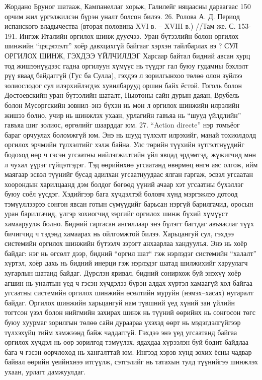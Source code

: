 Жордано Бруног шатааж, Кампанеллаг хорьж, Галилейг няцаасны дараагаас 150 орчим жил үргэлжилсэн бүрэн уналт болсон билээ. 26. Ролова А. Д. Период испанского владычества (вторая половина XVI в. – XVIII в.) //Там же. С. 153-191.
Ингэж Италийн оргилох шинж дуусчээ. Уран бүтээлийн болон оргилох шинжийн “цэцэглэлт” хоёр давхцахгүй байгааг хэрхэн тайлбарлах вэ ?
СУЛ ОРГИЛОХ ШИНЖ, ГЭХДЭЭ ҮЙЛЧИЛДЭГ
Харсаар байтал бидний авсан хурц тод жишээнүүдээс гадна оргилуун хүмүүс нь түүдэг гал буюу гудамны бэхлэлт рүү яваад байдаггүй (Гус ба Сулла), гэхдээ л зорилгынхоо төлөө олон зүйлээ золиослодог сул илэрхийлэгдэх хувилбарууд оршин байх ёстой. Гоголь болон Достоевскийн уран бүтээлийн шаталт, Ньютоны сайн дурын даяан, Врубель болон Мусоргскийн зовнил–энэ бүхэн нь мөн л оргилох шинжийн илрэлийн жишээ болно, учир нь шинжлэх ухаан, урлагийн гавъяа нь “шууд үйлдлийн” гавъяа шиг золиос, өргөлийг шаарддаг юм. 27. “Action directe” нэр томъёог бараг орчуулах боломжгүй юм. Энэ нь шууд түлхэлт илрэхийг, манай тохиолдолд оргилох эрчмийн түлхэлтийг хэлж байна.
Улс төрийн түүхийн зүтгэлтнүүдийг бодоход өөр ч гэсэн угсаатны нийлэгжилтийн үйл явцад эрдэмтэд, жүжигчид мөн л чухал үүрэг гүйцэтгэдэг. Тэд өөрийнхөө угсаатанд өвөрмөц өнгө аяс олгож, ийм маягаар эсвэл түүнийг бусад адилхан угсаатнуудаас ялган гаргаж, эсвэл угсаатан хоорондын харилцаанд дэм болдог бөгөөд үүний ачаар хэт угсаатны бүхэллэг буюу соёл үүсдэг. Хэдийгээр бага хүчдэлтэй боловч хүнд мэргэжлээ дотоод тэмүүллээрээ сонгон явсан готын сүмүүдийг барьсан нэргүй барилгачид, оросын уран барилгачид, үлгэр зохиогчид зэргийг оргилох шинж бүхий хүмүүст хамааруулж болно. Бидний гаргасан ангиллаар энэ бүлэгт багтдаг авъяаслаг түүх бичигчид ч тэдэнд хамаарах нь ойлгомжтой билээ.
Харьцангуй сул, гэхдээ системийн оргилох шинжийн бүтээлч зэрэгт анхаарлаа хандуулъя. Энэ нь хоёр байдаг: нэг нь өгсөлт дээр, бидний “оргил шат“ гэж нэрлэдэг системийн “халалт” хүртэл, хоёр дахь нь бидний инерци гэж нэрлэдэг шатад шилжихийг харуулагч хугарлын шатанд байдаг. Дүрслэн яривал, бидний сонирхож буй энэхүү хоёр агшин нь уналтын үед ч гэсэн хүчдэлээ бүрэн алдах хүртэл хамаагүй хол байгаа угсаатны системийн оргилох шинжийн өсөлтийн муруйн (нэмэх–хасах) нугаралт байдаг. Оргилох шинжийн харьцангуй нам түвшний үед хүний зан үйлийн тогтсон үзэл болон нийгмийн захирах шинж нь түүний өөрийнх нь сонгосон төгс буюу хуурмаг зорилгын төлөө сайн дураараа үхэхэд өөрт нь мэдэгдэлгүйгээр түлхэхүйц тийм хэмжээнд байж чаддаггүй. Гэхдээ энэ үед угсаатанд байгаа оргилох хүчдэл нь өөр зорилгод тэмүүлэх, ядахдаа хүрээлэн буй бодит байдлаа бага ч гэсэн өөрчлөхөд нь хангалттай юм. Ингээд хэрэв хүнд зохих ёсны чадвар байвал өөрийн үеийнхнээ итгүүлж, сэтгэлийг нь татахын тулд түүнийгээ шинжлэх ухаан, урлагт дамжуулдаг.
